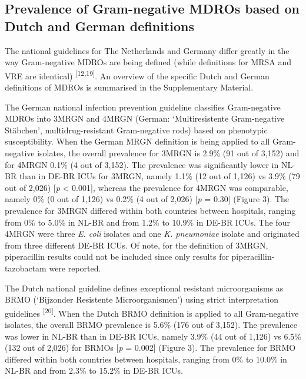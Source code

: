 \documentclass[
]{book}
\begin{document}
\hypertarget{prevalence-of-gram-negative-mdros-based-on-dutch-and-german-definitions}{%
\subsection{Prevalence of Gram-negative MDROs based on Dutch and German definitions}\label{prevalence-of-gram-negative-mdros-based-on-dutch-and-german-definitions}}

The national guidelines for The Netherlands and Germany differ greatly in the way Gram-negative MDROs are being defined (while definitions for MRSA and VRE are identical) \textsuperscript{{[}12,19{]}}. An overview of the specific Dutch and German definitions of MDROs is summarised in the Supplementary Material.

The German national infection prevention guideline classifies Gram-negative MDROs into 3MRGN and 4MRGN (German: `Multiresistente Gram-negative Stäbchen', multidrug-resistant Gram-negative rods) based on phenotypic susceptibility. When the German MRGN definition is being applied to all Gram-negative isolates, the overall prevalence for 3MRGN is 2.9\% (91 out of 3,152) and for 4MRGN 0.1\% (4 out of 3,152). The prevalence was significantly lower in NL-BR than in DE-BR ICUs for 3MRGN, namely 1.1\% (12 out of 1,126) vs 3.9\% (79 out of 2,026) {[}\emph{p} \textless{} 0.001{]}, whereas the prevalence for 4MRGN was comparable, namely 0\% (0 out of 1,126) vs 0.2\% (4 out of 2,026) {[}\emph{p} = 0.30{]} (Figure 3). The prevalence for 3MRGN differed within both countries between hospitals, ranging from 0\% to 5.0\% in NL-BR and from 1.2\% to 10.9\% in DE-BR ICUs. The four 4MRGN were three \emph{E. coli} isolates and one \emph{K. pneumoniae} isolate and originated from three different DE-BR ICUs. Of note, for the definition of 3MRGN, piperacillin results could not be included since only results for piperacillin-tazobactam were reported.

The Dutch national guideline defines exceptional resistant microorganisms as BRMO (`Bijzonder Resistente Microorganismen') using strict interpretation guidelines \textsuperscript{{[}20{]}}. When the Dutch BRMO definition is applied to all Gram-negative isolates, the overall BRMO prevalence is 5.6\% (176 out of 3,152). The prevalence was lower in NL-BR than in DE-BR ICUs, namely 3.9\% (44 out of 1,126) vs 6.5\% (132 out of 2,026) for BRMOs {[}\emph{p} = 0.002{]} (Figure 3). The prevalence for BRMO differed within both countries between hospitals, ranging from 0\% to 10.0\% in NL-BR and from 2.3\% to 15.2\% in DE-BR ICUs.
\end{document}
